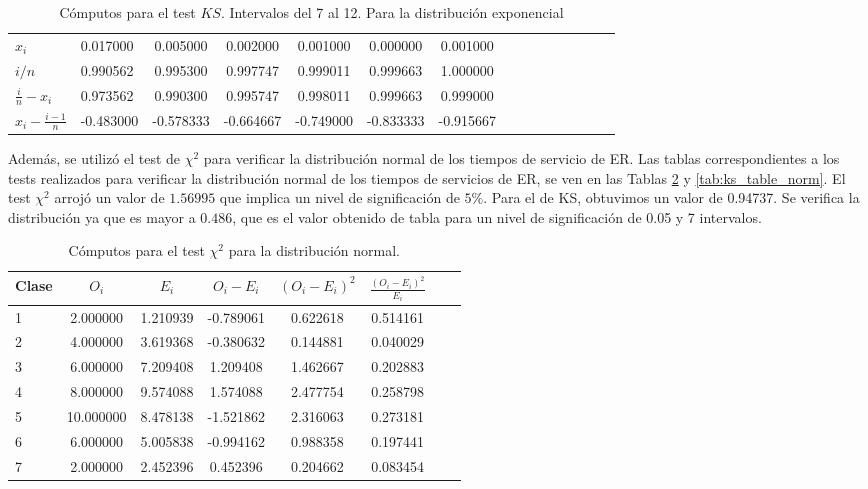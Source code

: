 \documentclass[a4paper,10pt]{article}
\begin{document}
\begin{table}[ht]
\begin{center}
\begin{tabular}{l|l*{12}{c}r}
\hline
$x_i$&0.017000&0.005000&0.002000&0.001000&0.000000&0.001000\\
$i/n$&0.990562&0.995300&0.997747&0.999011&0.999663&1.000000\\
$\frac{i}{n} - x_i$&0.973562&0.990300&0.995747&0.998011&0.999663&0.999000\\
$x_i - \frac{i-1}{n}$&-0.483000&-0.578333&-0.664667&-0.749000&-0.833333&-0.915667\\
\hline
\end{tabular}
\caption{\label{tab:ks_table_second} Cómputos para el test $KS$. Intervalos del 7 al 12. Para la distribución exponencial}
\end{center}
\end{table}

Además, se utilizó el test de $\chi^2$ para verificar la distribución normal de los tiempos de servicio de ER. Las tablas correspondientes a los tests realizados para verificar la distribución normal de los tiempos de servicios de ER, se ven en las Tablas \ref{tab:chi_table_norm} y \ref{tab:ks_table_norm}. El test $\chi^2$ arrojó un valor de $1.56995$ que implica un nivel de significación de $5\%$. Para el de KS, obtuvimos un valor de 0.94737. Se verifica la distribución ya que es mayor a $0.486$, que es el valor obtenido de tabla para un nivel de significación de 0.05 y 7 intervalos.


\begin{table}[ht]
\begin{center}
\begin{tabular}{l*{6}{c}r}
\hline
Clase& $O_i$ & $E_i$  & $O_i - E_i$ & $(O_i - E_i)^2$ & $\frac{(O_i - E_i)^2}{E_i}$\\
\hline
1&2.000000&1.210939&-0.789061&0.622618&0.514161\\
2&4.000000&3.619368&-0.380632&0.144881&0.040029\\
3&6.000000&7.209408&1.209408&1.462667&0.202883\\
4&8.000000&9.574088&1.574088&2.477754&0.258798\\
5&10.000000&8.478138&-1.521862&2.316063&0.273181\\
6&6.000000&5.005838&-0.994162&0.988358&0.197441\\
7&2.000000&2.452396&0.452396&0.204662&0.083454\\
\hline
\end{tabular}
\caption{\label{tab:chi_table_norm} Cómputos para el test $\chi^2$ para la distribución normal.}
\end{center}
\end{table}
\end{document}
